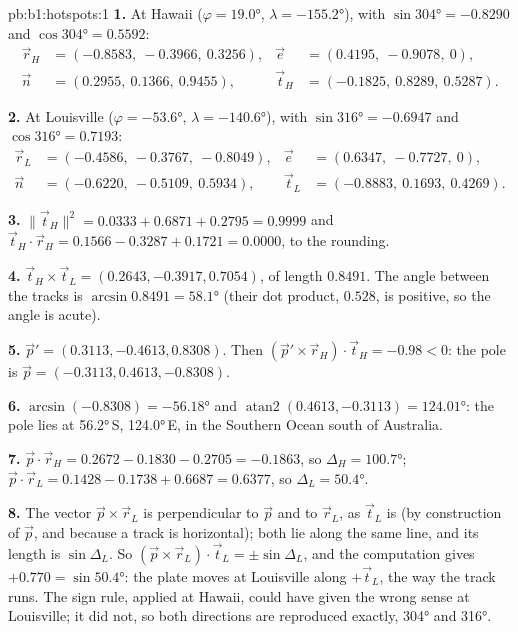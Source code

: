 \begin{solution}{pb:b1:hotspots:1}
\textbf{1.} At Hawaii ($\varphi = \ang{19.0}$, $\lambda = \ang{-155.2}$),
with $\sin\ang{304} = -0.8290$ and $\cos\ang{304} = 0.5592$:
\[
\begin{aligned}
  \vec r_H &= (-0.8583,\ -0.3966,\ 0.3256), &
  \vec e &= (0.4195,\ -0.9078,\ 0),\\
  \vec n &= (0.2955,\ 0.1366,\ 0.9455), &
  \vec t_H &= (-0.1825,\ 0.8289,\ 0.5287).
\end{aligned}
\]

\textbf{2.} At Louisville ($\varphi = \ang{-53.6}$, $\lambda = \ang{-140.6}$),
with $\sin\ang{316} = -0.6947$ and $\cos\ang{316} = 0.7193$:
\[
\begin{aligned}
  \vec r_L &= (-0.4586,\ -0.3767,\ -0.8049), &
  \vec e &= (0.6347,\ -0.7727,\ 0),\\
  \vec n &= (-0.6220,\ -0.5109,\ 0.5934), &
  \vec t_L &= (-0.8883,\ 0.1693,\ 0.4269).
\end{aligned}
\]

\textbf{3.} $\lVert\vec t_H\rVert^2 = 0.0333 + 0.6871 + 0.2795 = 0.9999$ and
$\vec t_H\cdot\vec r_H = 0.1566 - 0.3287 + 0.1721 = 0.0000$, to the rounding.

\textbf{4.} $\vec t_H\times\vec t_L = (0.2643, -0.3917, 0.7054)$, of length
$0.8491$. The angle between the tracks is $\arcsin0.8491 = \ang{58.1}$ (their
dot product, $0.528$, is positive, so the angle is acute).

\textbf{5.} $\vec p' = (0.3113, -0.4613, 0.8308)$. Then
$(\vec p'\times\vec r_H)\cdot\vec t_H = -0.98 < 0$: the pole is
$\vec p = (-0.3113, 0.4613, -0.8308)$.

\textbf{6.} $\arcsin(-0.8308) = \ang{-56.18}$ and
$\operatorname{atan2}(0.4613, -0.3113) = \ang{124.01}$: the pole lies at
\ang{56.2}\,S, \ang{124.0}\,E, in the Southern Ocean south of Australia.

\textbf{7.} $\vec p\cdot\vec r_H = 0.2672 - 0.1830 - 0.2705 = -0.1863$, so
$\Delta_H = \ang{100.7}$; $\vec p\cdot\vec r_L = 0.1428 - 0.1738 + 0.6687 =
0.6377$, so $\Delta_L = \ang{50.4}$.

\textbf{8.} The vector $\vec p\times\vec r_L$ is perpendicular to $\vec p$ and
to $\vec r_L$, as $\vec t_L$ is (by construction of $\vec p$, and because a
track is horizontal); both lie along the same line, and its length is
$\sin\Delta_L$. So $(\vec p\times\vec r_L)\cdot\vec t_L = \pm\sin\Delta_L$, and
the computation gives $+0.770 = \sin\ang{50.4}$: the plate moves at Louisville
along $+\vec t_L$, the way the track runs. The sign rule, applied at Hawaii,
could have given the wrong sense at Louisville; it did not, so both
directions are reproduced exactly, \ang{304} and \ang{316}.


\end{solution}
